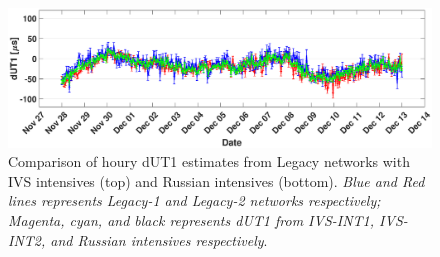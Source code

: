 \documentclass[smallextended]{svjour3}       %
\begin{document}
\begin{figure}
    \centering
    \includegraphics[scale=.28]{dut1hr.eps}
    \caption{Comparison of houry dUT1 estimates from Legacy networks with IVS intensives (top) and Russian intensives (bottom). \textit{Blue and Red lines represents Legacy-1 and Legacy-2 networks respectively; Magenta, cyan, and black represents dUT1 from IVS-INT1, IVS-INT2, and Russian intensives respectively}.}
    \label{fig:dut1int1hr}
\end{figure}




\end{document}

